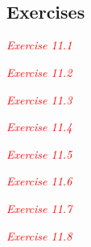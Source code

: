 \chapter{}
\label{chap:chapter11}
\minitoc




\textcolor{red}{\textit{}}
\begin{adjustwidth}{1cm}{}
\end{adjustwidth}


\begin{lstlisting}

\end{lstlisting}


\textbf{}




\section{Exercises}
\textcolor{red}{\textit{Exercise 11.1}}
\begin{adjustwidth}{1cm}{}

\end{adjustwidth}

\textcolor{red}{\textit{Exercise 11.2}}
\begin{adjustwidth}{1cm}{}

\end{adjustwidth}

\textcolor{red}{\textit{Exercise 11.3}}
\begin{adjustwidth}{1cm}{}

\end{adjustwidth}

\textcolor{red}{\textit{Exercise 11.4}}
\begin{adjustwidth}{1cm}{}

\end{adjustwidth}

\textcolor{red}{\textit{Exercise 11.5}}
\begin{adjustwidth}{1cm}{}

\end{adjustwidth}

\textcolor{red}{\textit{Exercise 11.6}}
\begin{adjustwidth}{1cm}{}

\end{adjustwidth}

\textcolor{red}{\textit{Exercise 11.7}}
\begin{adjustwidth}{1cm}{}

\end{adjustwidth}

\textcolor{red}{\textit{Exercise 11.8}}
\begin{adjustwidth}{1cm}{}

\end{adjustwidth}

